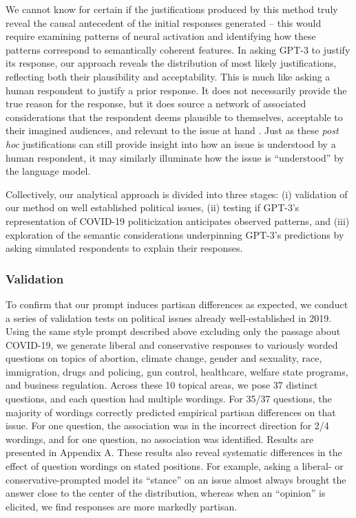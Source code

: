 \documentclass{article} %
\begin{document}
We cannot know for certain if the justifications produced by this method
truly reveal the causal antecedent of the initial responses generated --
this would require examining patterns of neural activation and
identifying how these patterns correspond to semantically coherent
features. In asking GPT-3 to justify its response, our approach reveals
the distribution of most likely justifications, reflecting both their
plausibility and acceptability. This is much like asking a human
respondent to justify a prior response. It does not necessarily provide
the true reason for the response, but it does source a network of
associated considerations that the respondent deems plausible to
themselves, acceptable to their imagined audiences, and relevant to the
issue at hand \parencite{Tourangeau2000-tk}. Just as these \emph{post hoc} justifications can still
provide insight into how an issue is understood by a human respondent,
it may similarly illuminate how the issue is ``understood'' by the
language model.

Collectively, our analytical approach is divided into three stages: (i)
validation of our method on well established political issues, (ii)
testing if GPT-3's representation of COVID-19 politicization anticipates
observed patterns, and (iii) exploration of the semantic considerations
underpinning GPT-3's predictions by asking simulated respondents to
explain their responses.

\subsubsection*{Validation}

To confirm that our prompt induces partisan differences as expected, we
conduct a series of validation tests on political issues already
well-established in 2019. Using the same style prompt described above
excluding only the passage about COVID-19, we generate liberal and
conservative responses to variously worded questions on topics of
abortion, climate change, gender and sexuality, race, immigration, drugs
and policing, gun control, healthcare, welfare state programs, and
business regulation. Across these 10 topical areas, we pose 37 distinct
questions, and each question had multiple wordings. For 35/37 questions,
the majority of wordings correctly predicted empirical partisan
differences on that issue. For one question, the association was in the
incorrect direction for 2/4 wordings, and for one question, no
association was identified. Results are presented in Appendix A. These
results also reveal systematic differences in the effect of question
wordings on stated positions. For example, asking a liberal- or
conservative-prompted model its ``stance'' on an issue almost always
brought the answer close to the center of the distribution, whereas when
an ``opinion'' is elicited, we find responses are more markedly
partisan.
\end{document}
